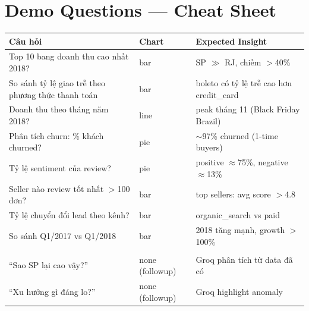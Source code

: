 \documentclass[12pt, a4paper]{article}
\begin{document}
\newpage

\section{Demo Questions — Cheat Sheet}

\begin{tcolorbox}[colback=groqgreen!5, colframe=groqgreen!50, arc=6pt,
  title={\faList\ Câu hỏi demo + Expected Output}]

\renewcommand{\arraystretch}{1.6}
\begin{tabularx}{\textwidth}{>{\ttfamily\small}p{5.5cm} p{2.5cm} X}
\toprule
\normalfont\bfseries Câu hỏi & \bfseries Chart & \bfseries Expected Insight \\
\midrule
Top 10 bang doanh thu cao nhất 2018? &
  bar &
  SP $\gg$ RJ, chiếm $>$40\% \\

So sánh tỷ lệ giao trễ theo phương thức thanh toán &
  bar &
  boleto có tỷ lệ trễ cao hơn credit\_card \\

Doanh thu theo tháng năm 2018? &
  line &
  peak tháng 11 (Black Friday Brazil) \\

Phân tích churn: \% khách churned? &
  pie &
  $\sim$97\% churned (1-time buyers) \\

Tỷ lệ sentiment của review? &
  pie &
  positive $\approx$75\%, negative $\approx$13\% \\

Seller nào review tốt nhất $>$100 đơn? &
  bar &
  top sellers: avg score $>$4.8 \\

Tỷ lệ chuyển đổi lead theo kênh? &
  bar &
  organic\_search vs paid \\

So sánh Q1/2017 vs Q1/2018 &
  bar &
  2018 tăng mạnh, growth $>$100\% \\
\midrule
\multicolumn{3}{l}{\bfseries Follow-up (sau câu query trước):} \\
``Sao SP lại cao vậy?'' & none (followup) & Groq phân tích từ data đã có \\
``Xu hướng gì đáng lo?'' & none (followup) & Groq highlight anomaly \\
\bottomrule
\end{tabularx}

\end{tcolorbox}
\end{document}
